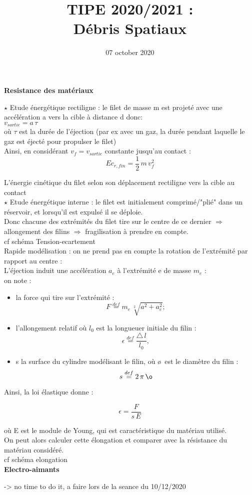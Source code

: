 \documentclass[a4paper,1pt]{article}
\title{TIPE 2020/2021 : \\ Débris Spatiaux}
\date{07 october 2020}
\begin{document}
\maketitle
\textbf{Resistance des matériaux}

$\star$ Etude énergétique rectiligne : le filet de masse m est projeté avec une accélération a vers la cible à 
distance d donc:\\

$ v_{sortie} = a\,\tau $\\

où $\tau$ est la durée de l'éjection (par ex avec un gaz, la durée pendant laquelle le gaz est éjecté pour propulser le filet)\\
Ainsi, en considérant $v_f = v_{sortie}$ constante jusqu'au contact :\\
$$ Ec_{r,fin} = \frac{1}{2}\,m\,v_f^2 $$

L'énergie cinétique du filet selon son déplacement rectiligne vers la cible au contact\\

$\star$ Etude énergétique interne : le filet est initialement comprimé/"plié" dans un réservoir, et lorsqu'il est expulsé il se déploie.\\
Donc chacune des extrémités du filet tire sur le centre de ce dernier $\Rightarrow$ allongement des filins $\Rightarrow$ fragilisation à prendre en compte.\\
cf schéma Tension-ecartement\\

Rapide modélisation : on ne prend pas en compte la rotation de l'extrémité par rapport au centre :\\
L'éjection induit une accélération $a_e$ à l'extrémité e de masse $m_e$ :\\
on note :
\begin{itemize}
    \item la force qui tire sur l'extrémité : $$F \stackrel{def}{=} m_e \, \sqrt[2]{a^2 + a_e^2};$$
    \item l'allongement relatif où $l_0$ est la longueuer initiale du filin : $$\epsilon \stackrel{def}{=} \frac{\triangle\,l}{l_0}, $$ 
    \item s la surface du cylindre modélisant le filin, où \o\, est le diamètre du filin : $$s \stackrel{def}{=} 2\,\pi\,\o$$
\end{itemize}

Ainsi, la loi élastique donne :

$$\epsilon = \frac{F}{s\,E}$$

où E est le module de Young, qui est caractéristique du matériau utilisé.\\

On peut alors calculer cette élongation et comparer avec la résistance du matériau considéré.\\
cf schéma elongation\\

\textbf{Electro-aimants}

-> no time to do it, a faire lors de la seance du 10/12/2020
\end{document}
